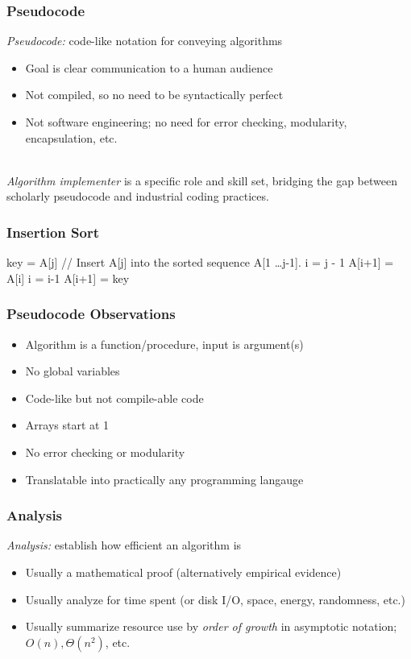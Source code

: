 \documentclass{beamer}
\newcommand{\stanza}{ \\~\ }
\begin{document}
\begin{frame} \frametitle{Pseudocode}
  \emph{Pseudocode:} code-like notation for conveying algorithms
  \begin{itemize}
    \item Goal is clear communication to a human audience
    \item Not compiled, so no need to be syntactically perfect
    \item Not software engineering; no need for error checking, modularity,
      encapsulation, etc. \stanza
  \end{itemize}

  \emph{Algorithm implementer} is a specific role and skill set, bridging the
    gap between scholarly pseudocode and industrial coding practices.
\end{frame}

\begin{frame} \frametitle{Insertion Sort}

\begin{algorithmic}[1]
    \State key = A[j]
    \State // Insert A[j] into the sorted sequence A[1 \ldots j-1].
    \State i = j - 1
      \State A[i+1] = A[i]
      \State i = i-1
    \EndWhile
    \State A[i+1] = key
  \EndFor
  \EndFunction
\end{algorithmic}

\end{frame}

\begin{frame} \frametitle{Pseudocode Observations}
  \begin{itemize}
    \item Algorithm is a function/procedure, input is argument(s)
    \item No global variables
    \item Code-like but not compile-able code
    \item Arrays start at 1
    \item No error checking or modularity
    \item Translatable into practically any programming langauge
  \end{itemize}
\end{frame}

\begin{frame} \frametitle{Analysis}
  \emph{Analysis:} establish how efficient an algorithm is
  \begin{itemize}
    \item Usually a mathematical proof (alternatively empirical evidence)
    \item Usually analyze for time spent (or disk I/O, space, energy,
      randomness, etc.)
    \item Usually summarize resource use by \emph{order of growth} in
      asymptotic notation; $O(n), \Theta(n^2)$, etc.
  \end{itemize}
\end{frame}
\end{document}
